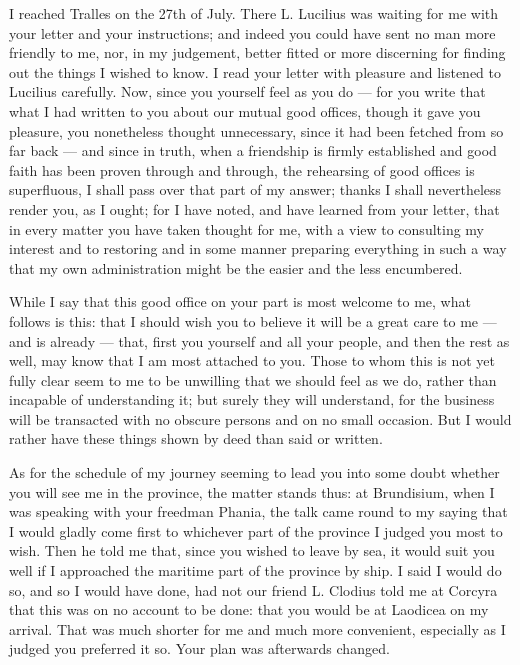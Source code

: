 

 I reached Tralles on the 27th of July. There L. Lucilius was waiting for me with your letter and your instructions; and indeed you could have sent no man more friendly to me, nor, in my judgement, better fitted or more discerning for finding out the things I wished to know. I read your letter with pleasure and listened to Lucilius carefully. Now, since you yourself feel as you do --- for you write that what I had written to you about our mutual good offices, though it gave you pleasure, you nonetheless thought unnecessary, since it had been fetched from so far back --- and since in truth, when a friendship is firmly established and good faith has been proven through and through, the rehearsing of good offices is superfluous, I shall pass over that part of my answer; thanks I shall nevertheless render you, as I ought; for I have noted, and have learned from your letter, that in every matter you have taken thought for me, with a view to consulting my interest and to restoring and in some manner preparing everything in such a way that my own administration might be the easier and the less encumbered.

 While I say that this good office on your part is most welcome to me, what follows is this: that I should wish you to believe it will be a great care to me --- and is already --- that, first you yourself and all your people, and then the rest as well, may know that I am most attached to you. Those to whom this is not yet fully clear seem to me to be unwilling that we should feel as we do, rather than incapable of understanding it; but surely they will understand, for the business will be transacted with no obscure persons and on no small occasion. But I would rather have these things shown by deed than said or written.

 As for the schedule of my journey seeming to lead you into some doubt whether you will see me in the province, the matter stands thus: at Brundisium, when I was speaking with your freedman Phania, the talk came round to my saying that I would gladly come first to whichever part of the province I judged you most to wish. Then he told me that, since you wished to leave by sea, it would suit you well if I approached the maritime part of the province by ship. I said I would do so, and so I would have done, had not our friend L. Clodius told me at Corcyra that this was on no account to be done: that you would be at Laodicea on my arrival. That was much shorter for me and much more convenient, especially as I judged you preferred it so. Your plan was afterwards changed.

